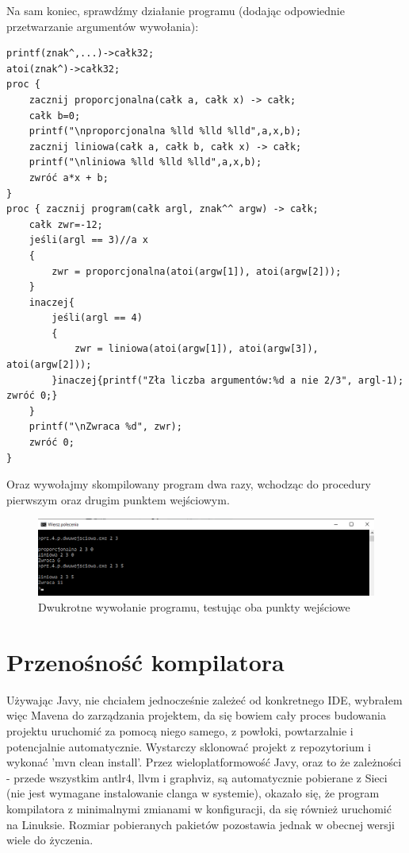 Na sam koniec, sprawdźmy działanie programu (dodając odpowiednie przetwarzanie argumentów wywołania):
\begin{lstlisting}
printf(znak^,...)->całk32;
atoi(znak^)->całk32;
proc {
    zacznij proporcjonalna(całk a, całk x) -> całk;
    całk b=0;
    printf("\nproporcjonalna %lld %lld %lld",a,x,b);
    zacznij liniowa(całk a, całk b, całk x) -> całk;
    printf("\nliniowa %lld %lld %lld",a,x,b);
    zwróć a*x + b;
}
proc { zacznij program(całk argl, znak^^ argw) -> całk;
    całk zwr=-12;
    jeśli(argl == 3)//a x
    {
        zwr = proporcjonalna(atoi(argw[1]), atoi(argw[2]));
    }
    inaczej{
        jeśli(argl == 4)
        {
            zwr = liniowa(atoi(argw[1]), atoi(argw[3]), atoi(argw[2]));
        }inaczej{printf("Zła liczba argumentów:%d a nie 2/3", argl-1); zwróć 0;}
    }
    printf("\nZwraca %d", zwr);
    zwróć 0;
}
\end{lstlisting}
Oraz wywołajmy skompilowany program dwa razy, wchodząc do procedury pierwszym oraz drugim punktem wejściowym.
\begin{figure}[H]
    \centering
    \includegraphics[width=1.0\textwidth]{images/2.rozdzielacz/cmdzrz.png}
    \caption{Dwukrotne wywołanie programu, testując oba punkty wejściowe}
\end{figure}

\section{Przenośność kompilatora}
Używając Javy, nie chciałem jednocześnie zależeć od konkretnego IDE, wybrałem więc Mavena do zarządzania projektem, da się bowiem cały proces budowania projektu uruchomić za pomocą niego samego, z powłoki, powtarzalnie i potencjalnie automatycznie. Wystarczy sklonować projekt z repozytorium i wykonać 'mvn clean install'. Przez wieloplatformowość Javy, oraz to że zależności - przede wszystkim antlr4, llvm i graphviz, są automatycznie pobierane z Sieci (nie jest wymagane instalowanie clanga w systemie), okazało się, że program kompilatora z minimalnymi zmianami w konfiguracji, da się również uruchomić na Linuksie. Rozmiar pobieranych pakietów pozostawia jednak w obecnej wersji wiele do życzenia.

